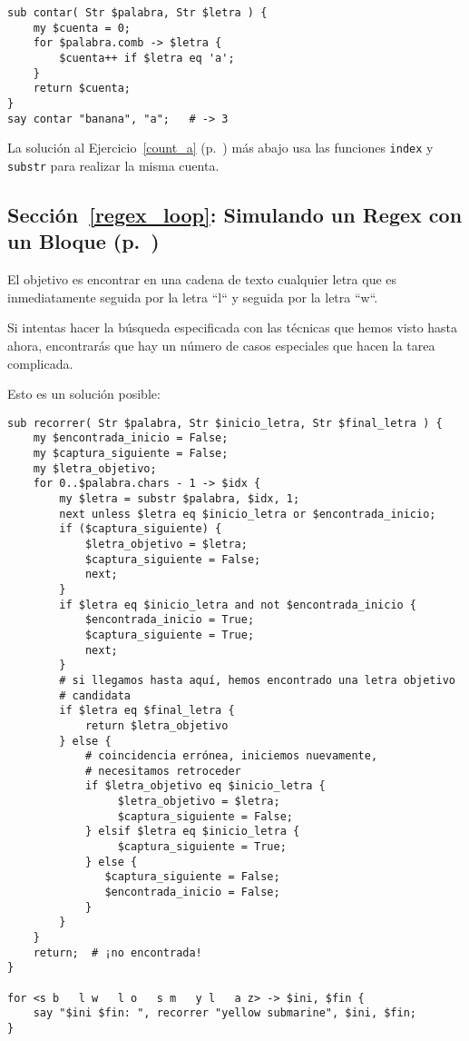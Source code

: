 \begin{verbatim}
sub contar( Str $palabra, Str $letra ) {
    my $cuenta = 0;
    for $palabra.comb -> $letra {
        $cuenta++ if $letra eq 'a';
    }
    return $cuenta;   
}
say contar "banana", "a";   # -> 3
\end{verbatim}
%

La solución al Ejercicio~\ref{count_a} 
(p.~\pageref{sol_count_a}) más abajo usa las 
funciones {\tt index} y {\tt substr} para 
realizar la misma cuenta.


\subsection{Sección~\ref{regex_loop}: Simulando un Regex con un Bloque (p.~\pageref{regex_loop})}
\label{sol_regex_loop}

El objetivo es encontrar en una cadena de texto cualquier letra
que es inmediatamente seguida por la letra ``l`` y seguida
por la letra ``w``.

Si intentas hacer la búsqueda especificada con las técnicas
que hemos visto hasta ahora, encontrarás que hay un número 
de casos especiales que hacen la tarea complicada.

Esto es un solución posible:

\begin{verbatim}
sub recorrer( Str $palabra, Str $inicio_letra, Str $final_letra ) {
    my $encontrada_inicio = False;
    my $captura_siguiente = False;
    my $letra_objetivo;
    for 0..$palabra.chars - 1 -> $idx {
        my $letra = substr $palabra, $idx, 1;
        next unless $letra eq $inicio_letra or $encontrada_inicio;
        if ($captura_siguiente) {
            $letra_objetivo = $letra;
            $captura_siguiente = False;
            next;
        }
        if $letra eq $inicio_letra and not $encontrada_inicio {
            $encontrada_inicio = True;
            $captura_siguiente = True;
            next;
        }
        # si llegamos hasta aquí, hemos encontrado una letra objetivo
        # candidata
        if $letra eq $final_letra {
            return $letra_objetivo
        } else {
            # coincidencia errónea, iniciemos nuevamente, 
            # necesitamos retroceder
            if $letra_objetivo eq $inicio_letra {
                 $letra_objetivo = $letra;
                 $captura_siguiente = False;
            } elsif $letra eq $inicio_letra {
                 $captura_siguiente = True;
            } else {
               $captura_siguiente = False;
               $encontrada_inicio = False;
            } 
        } 
    }
    return;  # ¡no encontrada!
}          

for <s b   l w   l o   s m   y l   a z> -> $ini, $fin {
    say "$ini $fin: ", recorrer "yellow submarine", $ini, $fin;  
}
\end{verbatim}


